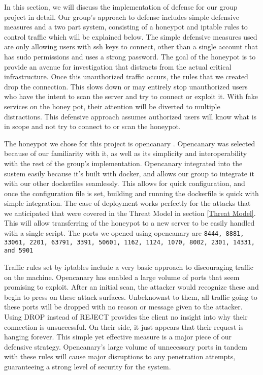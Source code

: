 In this section, we will discuss the implementation of defense for our group project in detail. Our group's approach to defense includes simple defensive measures and a two part system, consisting of a honeypot and iptable rules to control traffic which will be explained below. The simple defensive measures used are only allowing users with ssh keys to connect, other than a single account that has sudo permissions and uses a strong password. The goal of the honeypot is to provide an avenue for investigation that distracts from the actual critical infrastructure. Once this unauthorized traffic occurs, the rules that we created drop the connection. This slows down or may entirely stop unauthorized users who have the intent to scan the server and try to connect or exploit it. With fake services on the honey pot, their attention will be diverted to multiple distractions. This defensive approach assumes authorized users will know what is in scope and not try to connect to or scan the honeypot.

The honeypot we chose for this project is opencanary \cite{opencanary}. Opencanary was selected because of our familiarity with it, as well as its simplicity and interoperability with the rest of the group's implementation. Opencanary integrated into the sustem easily because it’s built with docker, and allows our group to integrate it with our other dockerfiles seamlessly. This allows for quick configuration, and once the configuration file is set, building and running the dockerfile is quick with simple integration. The ease of deployment works perfectly for the attacks that we anticipated that were covered in the Threat Model in section \ref{Threat Model}. This will allow transferring of the honeypot to a new server to be easily handled with a single script. The ports we opened using opencanary are \texttt{8444, 8881, 33061, 2201, 63791, 3391, 50601, 1162, 1124, 1070, 8002, 2301, 14331, and 5901}

Traffic rules set by iptables include a very basic approach to discouraging traffic on the machine. Opencanary has enabled a large volume of ports that seem promising to exploit. After an initial scan, the attacker would recognize these and begin to press on these attack surfaces. Unbeknownst to them, all traffic going to these ports will be dropped with no reason or message given to the attacker. Using DROP instead of REJECT provides the client no insight into why their connection is unsuccessful. On their side, it just appears that their request is hanging forever. This simple yet effective measure is a major piece of our defensive strategy. Opencanary’s large volume of unnecessary ports in tandem with these rules will cause major disruptions to any penetration attempts, guaranteeing a strong level of security for the system. 

